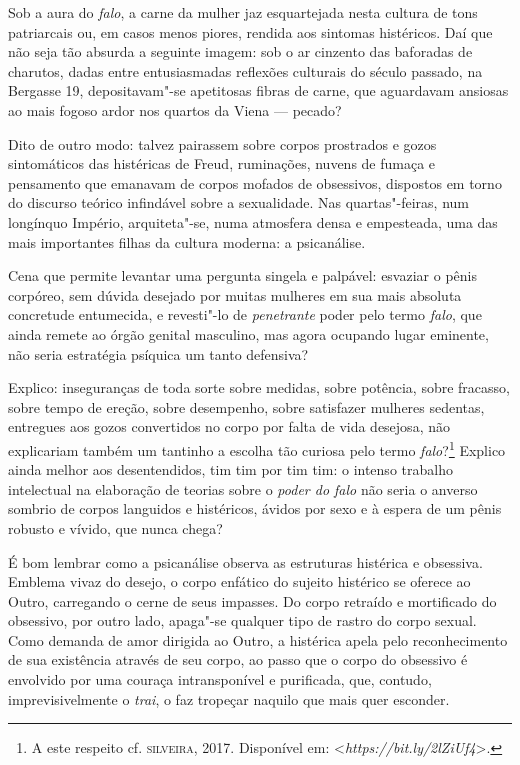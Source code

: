 Sob a aura do \emph{falo}, a carne da mulher jaz esquartejada nesta
cultura de tons patriarcais ou, em casos menos piores, rendida aos
sintomas histéricos. Daí que não seja tão absurda a seguinte imagem: sob
o ar cinzento das baforadas de charutos, dadas entre entusiasmadas
reflexões culturais do século passado, na Bergasse 19, depositavam"-se
apetitosas fibras de carne, que aguardavam ansiosas ao mais fogoso ardor
nos quartos da Viena --- pecado?

Dito de outro modo: talvez pairassem sobre corpos prostrados e gozos
sintomáticos das histéricas de Freud, ruminações, nuvens de fumaça e
pensamento que emanavam de corpos mofados de obsessivos, dispostos em
torno do discurso teórico infindável sobre a sexualidade. Nas
quartas"-feiras, num longínquo Império, arquiteta"-se, numa atmosfera
densa e empesteada, uma das mais importantes filhas da cultura moderna:
a psicanálise.

Cena que permite levantar uma pergunta singela e palpável: esvaziar o
pênis corpóreo, sem dúvida desejado por muitas mulheres em sua mais
absoluta concretude entumecida, e revesti"-lo de \emph{penetrante} poder
pelo termo \emph{falo}, que ainda remete ao órgão genital masculino, mas
agora ocupando lugar eminente, não seria estratégia psíquica um tanto
defensiva?

Explico: inseguranças de toda sorte sobre medidas, sobre potência, sobre
fracasso, sobre tempo de ereção, sobre desempenho, sobre satisfazer
mulheres sedentas, entregues aos gozos convertidos no corpo por falta de
vida desejosa, não explicariam também um tantinho a escolha tão curiosa
pelo termo \emph{falo}?\footnote{A este respeito cf. \textsc{silveira}, 2017. Disponível em:
  \textless{}\emph{https://bit.ly/2lZiUf4}\textgreater{}.}
Explico ainda melhor aos desentendidos, tim tim por tim tim: o intenso
trabalho intelectual na elaboração de teorias sobre o \emph{poder do
falo} não seria o anverso sombrio de corpos languidos e histéricos,
ávidos por sexo e à espera de um pênis robusto e vívido, que nunca
chega?

É bom lembrar como a psicanálise observa as estruturas histérica e
obsessiva. Emblema vivaz do desejo, o corpo enfático do sujeito
histérico se oferece ao Outro, carregando o cerne de seus impasses. Do
corpo retraído e mortificado do obsessivo, por outro lado, apaga"-se
qualquer tipo de rastro do corpo sexual. Como demanda de amor dirigida
ao Outro, a histérica apela pelo reconhecimento de sua existência
através de seu corpo, ao passo que o corpo do obsessivo é envolvido por
uma couraça intransponível e purificada, que, contudo, imprevisivelmente
o \emph{trai}, o faz tropeçar naquilo que mais quer esconder.

